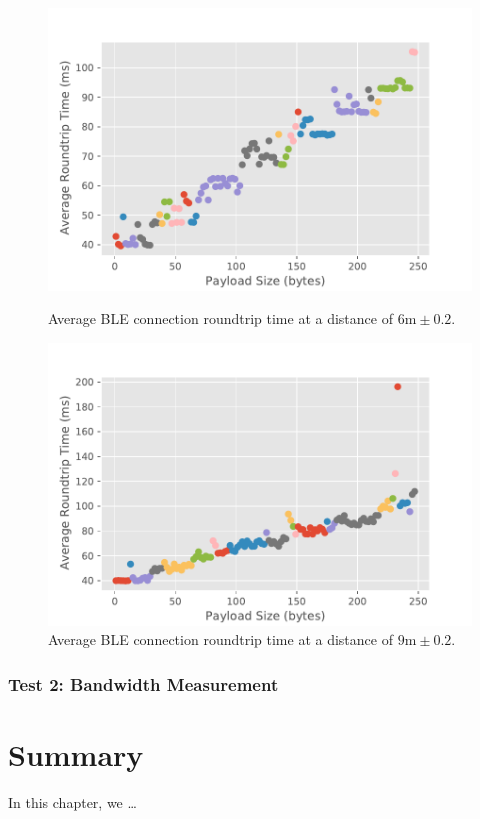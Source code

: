 

\begin{figure}[H]
    \begin{minipage}[r]{0.49\linewidth}
    \centering
    \includegraphics[width=\linewidth]{images/ble-roundtrip-hci0-600cm.pdf}
    \caption[Average \acs{BLE} connection roundtrip time at a distance of 6m.]{Average \acs{BLE} connection roundtrip time at a distance of $6\text{m} \pm 0.2$.}
    \label{fig:ble-roundtrip-6cm}
    \end{minipage}
    \begin{minipage}[l]{0.49\linewidth}
        \centering
        \includegraphics[width=\linewidth]{images/ble-roundtrip-hci0-900cm.pdf}
        \caption[Average roundtrip time obtained at a distance of 9m using \acs{BLE} connection.]{Average \acs{BLE} connection roundtrip time at a distance of $9\text{m} \pm 0.2$.}
        \label{fig:ble-roundtrip-9cm}
        \end{minipage}
\end{figure}

\subsubsection{Test 2: Bandwidth Measurement}


\section{Summary}
In this chapter, we \dots